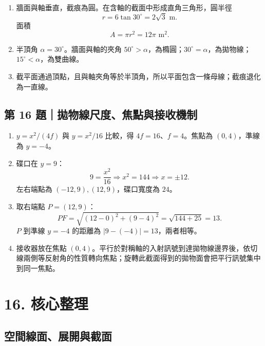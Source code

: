 \documentclass[11pt,a4paper]{article}
\providecommand{\tightlist}{%
  \setlength{\itemsep}{0pt}\setlength{\parskip}{0pt}}
\begin{document}
\begin{enumerate}
\def\labelenumi{\arabic{enumi}.}
\tightlist
\item
  牆面與軸垂直，截痕為圓。在含軸的截面中形成直角三角形，圓半徑
  \[
  r=6\tan30^\circ=2\sqrt3\text{ m}.
  \]
  面積
  \[
  A=\pi r^2=12\pi\text{ m}^2.
  \]
\item
  半頂角 \(\alpha=30^\circ\)。牆面與軸的夾角 \(50^\circ>\alpha\)，為橢圓；\(30^\circ=\alpha\)，為拋物線；\(15^\circ<\alpha\)，為雙曲線。
\item
  截平面通過頂點，且與軸夾角等於半頂角，所以平面包含一條母線；截痕退化為一直線。
\end{enumerate}

\subsection{第 16 題｜拋物線尺度、焦點與接收機制}\label{ux7b2c-16-ux984cux62cbux7269ux7ddaux5c3aux5ea6ux7126ux9edeux8207ux63a5ux6536ux6a5fux5236}

\begin{enumerate}
\def\labelenumi{\arabic{enumi}.}
\tightlist
\item
  \(y=x^2/(4f)\) 與 \(y=x^2/16\) 比較，得 \(4f=16\)、\(f=4\)。焦點為 \((0,4)\)，準線為 \(y=-4\)。
\item
  碟口在 \(y=9\)：
  \[
  9=\frac{x^2}{16}
  \Rightarrow x^2=144
  \Rightarrow x=\pm12.
  \]
  左右端點為 \((-12,9),(12,9)\)，碟口寬度為 \(24\)。
\item
  取右端點 \(P=(12,9)\)：
  \[
  PF=\sqrt{(12-0)^2+(9-4)^2}=\sqrt{144+25}=13.
  \]
  \(P\) 到準線 \(y=-4\) 的距離為 \(|9-(-4)|=13\)，兩者相等。
\item
  接收器放在焦點 \((0,4)\)。平行於對稱軸的入射訊號到達拋物線邊界後，依切線兩側等反射角的性質轉向焦點；旋轉此截面得到的拋物面會把平行訊號集中到同一焦點。
\end{enumerate}

\section{16. 核心整理}\label{ux6838ux5fc3ux6574ux7406}

\subsection{空間線面、展開與截面}\label{ux7a7aux9593ux7ddaux9762ux5c55ux958bux8207ux622aux9762}
\end{document}
